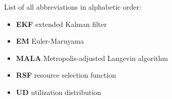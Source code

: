 
List of all abbreviations in alphabetic order:

\begin{itemize}
    \item \textbf{EKF} extended Kalman filter
    \item \textbf{EM} Euler-Maruyama
    \item \textbf{MALA} Metropolis-adjusted Langevin algorithm
    \item \textbf{RSF} resource selection function
    \item \textbf{UD} utilization distribution
    
    
\end{itemize}